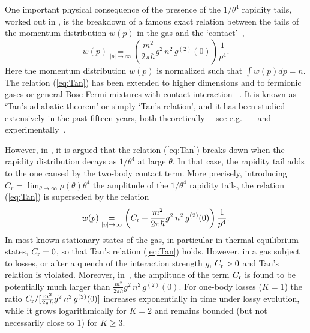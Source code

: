 \documentclass[onecolumn,amsfonts,showpacs,superscriptaddress]{revtex4-1}
\begin{document}
\vspace{0.5cm}

One important physical consequence of the presence of the $1/\theta^4$ rapidity tails, worked out in \citep{bouchoule_breakdown_2020}, is the breakdown of a famous exact relation between the tails of the momentum distribution $w(p)$ in the gas and the `contact'~\citep{minguzzi2002high,olshanii2003short},
\begin{equation}
    \label{eq:Tan}
    w(p) \underset{|p| \rightarrow \infty}{=} \left(  \frac{m^2}{2\pi \hbar} g^2 \, n^2 \, g^{(2)}(0) \right) \frac{1}{p^4} .
\end{equation}
Here the momentum distribution $w(p)$ is normalized such that $\int w(p) dp = n$. The relation (\ref{eq:Tan}) has been extended to higher dimensions and to fermionic gases or general Bose-Fermi mixtures with contact interaction~ \citep{tan2008energetics,tan2008large,tan2008generalized}. It is known as `Tan's adiabatic theorem' or simply `Tan's relation', and it has been studied extensively in the past fifteen years, both theoretically ---see e.g.~\citep{minguzzi2002high,olshanii2003short,tan2008energetics,tan2008large,tan2008generalized,braaten2008exact,barth2011tan,werner2012generalI,werner2012generalII,yao_tans_2018}--- and experimentally~\citep{kuhnle2010universal,stewart_verification_2010,wild2012measurements}.

However, in \citep{bouchoule_breakdown_2020}, it is argued that the relation (\ref{eq:Tan}) breaks down when the rapidity %
distribution  decays as  $1/\theta^4$ at large $\theta$. %
In that case, the rapidity tail adds to the one caused by the two-body contact term. More precisely, introducing $C_r=\lim_{\theta\rightarrow\infty} \rho(\theta)\theta^4$ the amplitude of the $1/\theta^4$ rapidity tails, the relation (\ref{eq:Tan}) is superseded by the relation %
\begin{equation}
    \label{eq:CrCc}
    w(p) \underset{|p| \rightarrow \infty}{=} \left( C_{\rm r} + \frac{m^2}{2\pi \hbar} g^2 \, n^2 \, g^{(2)}(0) \right) \frac{1}{p^4} .
\end{equation}
In most known stationary states of the gas, in particular in thermal equilibrium states, $C_{\rm r}=0$, so that Tan's relation (\ref{eq:Tan}) holds. However, in a gas subject to losses, or after a quench of the interaction strength $g$, $C_{\rm r} > 0$ and Tan's relation is violated. Moreover, in~\citep{bouchoule_breakdown_2020}, the amplitude of the  term $C_{\rm r}$ is found to be potentially much larger than $\frac{m^2}{2\pi \hbar} g^2 \, n^2 \, g^{(2)}(0)$. For one-body losses ($K=1$) the ratio $C_{\rm r}/ [ \frac{m^2}{2\pi \hbar} g^2 \, n^2 \, g^{(2)}(0) ]$ increases exponentially in time under lossy evolution, while it grows  logarithmically for $K=2$ and remains bounded (but not necessarily close to $1$) for $K\geq 3$.
\end{document}
